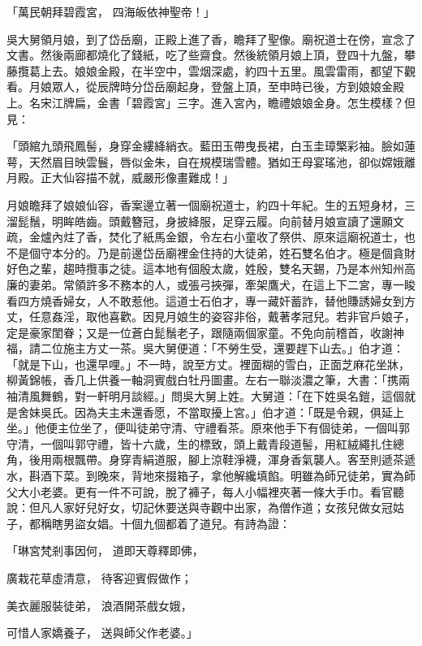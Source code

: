 「萬民朝拜碧霞宮，  四海皈依神聖帝！」

吳大舅領月娘，到了岱岳廟，正殿上進了香，瞻拜了聖像。廟祝道士在傍，宣念了文書。然後兩廊都燒化了錢紙，吃了些齋食。然後統領月娘上頂，登四十九盤，攀藤攬葛上去。娘娘金殿，在半空中，雲烟深處，約四十五里。風雲雷雨，都望下觀看。月娘眾人，從辰牌時分岱岳廟起身，登盤上頂，至申時已後，方到娘娘金殿上。名宋江牌扁，金書「碧霞宮」三字。進入宮內，瞻禮娘娘金身。怎生模樣？但見：

「頭綰九頭飛鳳髻，身穿金縷絳綃衣。藍田玉帶曳長裙，白玉圭璋檠彩袖。臉如蓮萼，天然眉目映雲鬟，唇似金朱，自在規模瑞雪體。猶如王母宴瑤池，卻似嫦娥離月殿。正大仙容描不就，威嚴形像畫難成！」

月娘瞻拜了娘娘仙容，香案邊立著一個廟祝道士，約四十年紀。生的五短身材，三溜髭鬚，明眸皓齒。頭戴簪冠，身披絳服，足穿云履。向前替月娘宣讀了還願文疏，金爐內炷了香，焚化了紙馬金銀，令左右小童收了祭供、原來這廟祝道士，也不是個守本分的。乃是前邊岱岳廟裡金住持的大徒弟，姓石雙名伯才。極是個貪財好色之輩，趨時攬事之徒。這本地有個殷太歲，姓殷，雙名天錫，乃是本州知州高廉的妻弟。常領許多不務本的人，或張弓挾彈，牽架鷹犬，在這上下二宮，專一睃看四方燒香婦女，人不敢惹他。這道士石伯才，專一藏奸蓄詐，替他賺誘婦女到方丈，任意姦淫，取他喜歡。因見月娘生的姿容非俗，戴著孝冠兒。若非官戶娘子，定是豪家閨眷；又是一位蒼白髭鬚老子，跟隨兩個家童。不免向前稽首，收謝神福，請二位施主方丈一茶。吳大舅便道：「不勞生受，還要趕下山去。」伯才道：「就是下山，也還早哩。」不一時，說至方丈。裡面糊的雪白，正面芝麻花坐牀，柳黃錦帳，香几上供養一軸洞賓戲白牡丹圖畫。左右一聯淡濃之筆，大書：「携兩袖清風舞鶴，對一軒明月談經。」問吳大舅上姓。大舅道：「在下姓吳名鎧，這個就是舍妹吳氏。因為夫主未還香愿，不當取擾上宮。」伯才道：「既是令親，俱延上坐。」他便主位坐了，便叫徒弟守清、守禮看茶。原來他手下有個徒弟，一個叫郭守清，一個叫郭守禮，皆十六歲，生的標致，頭上戴青段道髻，用紅絨繩扎住總角，後用兩根飄帶。身穿青絹道服，腳上涼鞋淨襪，渾身香氣襲人。客至則遞茶遞水，斟酒下菜。到晚來，背地來掇箱子，拿他解纔填餡。明雖為師兄徒弟，實為師父大小老婆。更有一件不可說，脫了褲子，每人小幅裡夾著一條大手巾。看官聽說：但凡人家好兒好女，切記休要送與寺觀中出家，為僧作道；女孩兒做女冠姑子，都稱瞎男盜女娼。十個九個都着了道兒。有詩為證：

「琳宮梵剎事因何，  道即天尊釋即佛，

廣栽花草虛清意，  待客迎賓假做作；

美衣麗服裝徒弟，  浪酒開茶戲女娥，

可惜人家嬌養子，  送與師父作老婆。」


